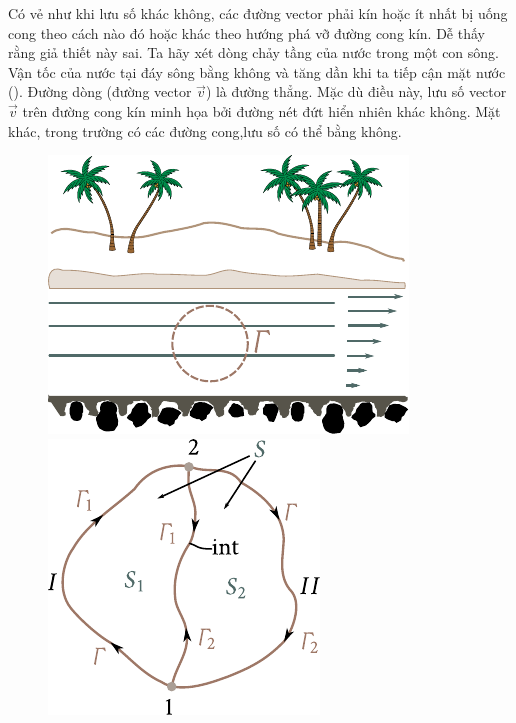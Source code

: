 Có vẻ như khi lưu số khác không, các đường vector phải kín hoặc ít nhất bị uống cong theo cách nào đó hoặc khác theo hướng phá vỡ đường cong kín. Dễ thấy rằng giả thiết này sai. Ta hãy xét dòng chảy tầng của nước trong một con sông. Vận tốc của nước tại đáy sông bằng không và tăng dần khi ta tiếp cận mặt nước (). Đường dòng (đường vector $\vec{v}$) là đường thẳng. Mặc dù điều này, lưu số vector $\vec{v}$ trên đường cong kín minh họa bởi đường nét đứt hiển nhiên khác không. Mặt khác, trong trường có các đường cong,lưu số có thể bằng không.

\begin{figure}[!htb]
	\begin{minipage}[t]{0.5\linewidth}
		\begin{center}
			\includegraphics[scale=0.95]{figures/ch_01/fig_1_27.pdf}
			\caption[]{}
			\label{fig:1_27}
		\end{center}
	\end{minipage}
	\hspace{-0.05cm}
	\begin{minipage}[t]{0.5\linewidth}
		\begin{center}
			\includegraphics[scale=0.95]{figures/ch_01/fig_1_28.pdf}
			\caption[]{}
			\label{fig:1_28}
		\end{center}
	\end{minipage}
\vspace{-0.65cm}
\end{figure}

